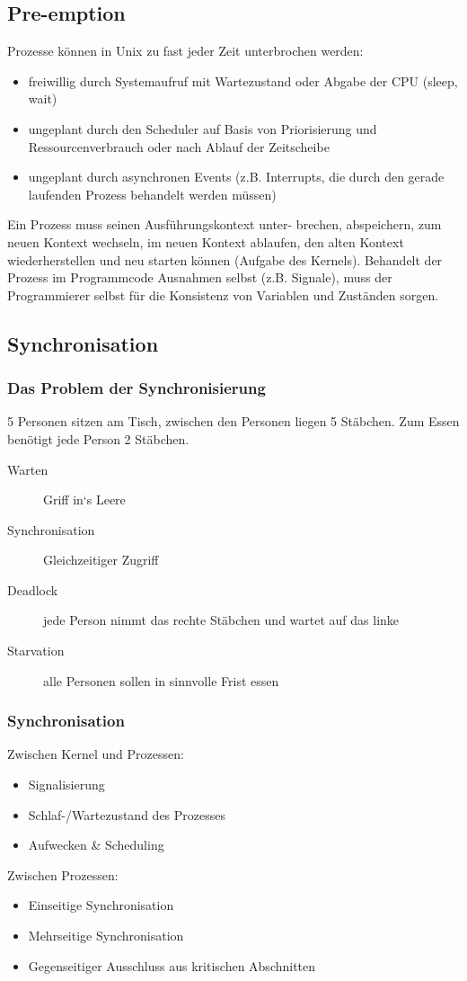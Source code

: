 \documentclass[a4paper, 10pt]{article}
\begin{document}
\subsection{Pre-emption}
Prozesse können in Unix zu fast jeder Zeit unterbrochen werden:
\begin{itemize}
	\item freiwillig durch Systemaufruf mit Wartezustand oder Abgabe der CPU (sleep, wait)
	\item ungeplant durch den Scheduler auf Basis von Priorisierung und Ressourcenverbrauch oder nach Ablauf der Zeitscheibe
	\item ungeplant durch asynchronen Events (z.B. Interrupts, die durch den gerade laufenden Prozess behandelt werden m\"ussen)
\end{itemize}
Ein Prozess muss seinen Ausf\"uhrungskontext unter- brechen, abspeichern, zum neuen Kontext wechseln, im neuen Kontext ablaufen, den alten Kontext wiederherstellen und neu starten können (Aufgabe des Kernels). Behandelt der Prozess im Programmcode Ausnahmen selbst (z.B. Signale), muss der Programmierer selbst f\"ur die Konsistenz von Variablen und Zust\"anden sorgen.

\subsection{Synchronisation}
\subsubsection{Das Problem der Synchronisierung}
5 Personen sitzen am Tisch, zwischen den Personen liegen 5 St\"abchen. Zum Essen benötigt jede Person 2 St\"abchen.
\begin{description}
	\item[Warten] Griff in‘s Leere
	\item[Synchronisation] Gleichzeitiger Zugriff
	\item[Deadlock] jede Person nimmt das rechte St\"abchen und wartet auf das linke
	\item[Starvation] alle Personen sollen in sinnvolle Frist essen
\end{description}

\subsubsection{Synchronisation}
Zwischen Kernel und Prozessen:
\begin{itemize}
	\item Signalisierung	
	\item Schlaf-/Wartezustand des Prozesses
	\item Aufwecken \& Scheduling
\end{itemize}
Zwischen Prozessen:
\begin{itemize}
	\item Einseitige Synchronisation
	\item Mehrseitige Synchronisation
	\item Gegenseitiger Ausschluss aus kritischen Abschnitten
\end{itemize}
\end{document}
